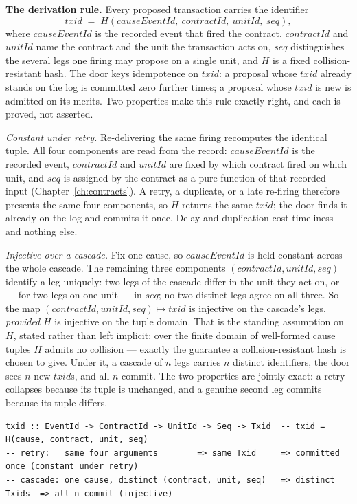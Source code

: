 \textbf{The derivation rule.} Every proposed transaction carries the identifier
\[
  \mathit{txid} \;=\; H(\mathit{causeEventId},\ \mathit{contractId},\ \mathit{unitId},\ \mathit{seq}),
\]
where $\mathit{causeEventId}$ is the recorded event that fired the contract,
$\mathit{contractId}$ and $\mathit{unitId}$ name the contract and the unit the
transaction acts on, $\mathit{seq}$ distinguishes the several legs one firing may
propose on a single unit, and $H$ is a fixed collision-resistant hash. The door keys
idempotence on $\mathit{txid}$: a proposal whose $\mathit{txid}$ already stands on the
log is committed zero further times; a proposal whose $\mathit{txid}$ is new is
admitted on its merits. Two properties make this rule exactly right, and each is
proved, not asserted.

\emph{Constant under retry.} Re-delivering the same firing recomputes the identical
tuple. All four components are read from the record: $\mathit{causeEventId}$ is the
recorded event, $\mathit{contractId}$ and $\mathit{unitId}$ are fixed by which
contract fired on which unit, and $\mathit{seq}$ is assigned by the contract as a pure
function of that recorded input (Chapter~\ref{ch:contracts}). A retry, a duplicate, or
a late re-firing therefore presents the same four components, so $H$ returns the same
$\mathit{txid}$; the door finds it already on the log and commits it once. Delay and
duplication cost timeliness and nothing else.

\emph{Injective over a cascade.} Fix one cause, so $\mathit{causeEventId}$ is held
constant across the whole cascade. The remaining three components
$(\mathit{contractId}, \mathit{unitId}, \mathit{seq})$ identify a leg uniquely: two
legs of the cascade differ in the unit they act on, or --- for two legs on one unit
--- in $\mathit{seq}$; no two distinct legs agree on all three. So the map
$(\mathit{contractId}, \mathit{unitId}, \mathit{seq}) \mapsto \mathit{txid}$ is
injective on the cascade's legs, \emph{provided} $H$ is injective on the tuple domain.
That is the standing assumption on $H$, stated rather than left implicit: over the
finite domain of well-formed cause tuples $H$ admits no collision --- exactly the
guarantee a collision-resistant hash is chosen to give. Under it, a cascade of $n$
legs carries $n$ distinct identifiers, the door sees $n$ new $\mathit{txid}$s, and all
$n$ commit. The two properties are jointly exact: a retry collapses because its tuple
is unchanged, and a genuine second leg commits because its tuple differs.

\begin{lstlisting}
txid :: EventId -> ContractId -> UnitId -> Seq -> Txid  -- txid = H(cause, contract, unit, seq)
-- retry:   same four arguments        => same Txid     => committed once (constant under retry)
-- cascade: one cause, distinct (contract, unit, seq)   => distinct Txids  => all n commit (injective)
\end{lstlisting}

